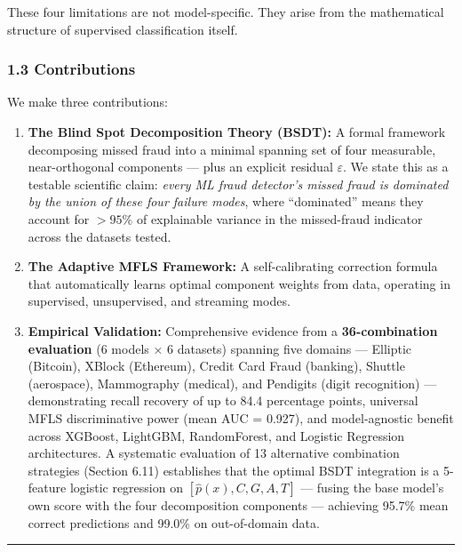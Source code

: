\documentclass[
  11pt,
]{article}
\begin{document}
These four limitations are not model-specific. They arise from the
mathematical structure of supervised classification itself.

\subsubsection{1.3 Contributions}\label{contributions}

We make three contributions:

\begin{enumerate}
\def\labelenumi{\arabic{enumi}.}
\item
  \textbf{The Blind Spot Decomposition Theory (BSDT):} A formal
  framework decomposing missed fraud into a minimal spanning set of four
  measurable, near-orthogonal components — plus an explicit residual
  \(\varepsilon\). We state this as a testable scientific claim:
  \emph{every ML fraud detector’s missed fraud is dominated by the union
  of these four failure modes}, where “dominated” means they account for
  \(>95\%\) of explainable variance in the missed-fraud indicator across
  the datasets tested.
\item
  \textbf{The Adaptive MFLS Framework:} A self-calibrating correction
  formula that automatically learns optimal component weights from data,
  operating in supervised, unsupervised, and streaming modes.
\item
  \textbf{Empirical Validation:} Comprehensive evidence from a
  \textbf{36-combination evaluation} (6 models × 6 datasets) spanning
  five domains — Elliptic (Bitcoin), XBlock (Ethereum), Credit Card
  Fraud (banking), Shuttle (aerospace), Mammography (medical), and
  Pendigits (digit recognition) — demonstrating recall recovery of up to
  84.4 percentage points, universal MFLS discriminative power (mean AUC
  = 0.927), and model-agnostic benefit across XGBoost, LightGBM,
  RandomForest, and Logistic Regression architectures. A systematic
  evaluation of 13 alternative combination strategies (Section 6.11)
  establishes that the optimal BSDT integration is a 5-feature logistic
  regression on \([\hat{p}(x), C, G, A, T]\) — fusing the base model’s
  own score with the four decomposition components — achieving 95.7\%
  mean correct predictions and 99.0\% on out-of-domain data.
\end{enumerate}

\begin{center}\rule{0.5\linewidth}{0.5pt}\end{center}
\end{document}

